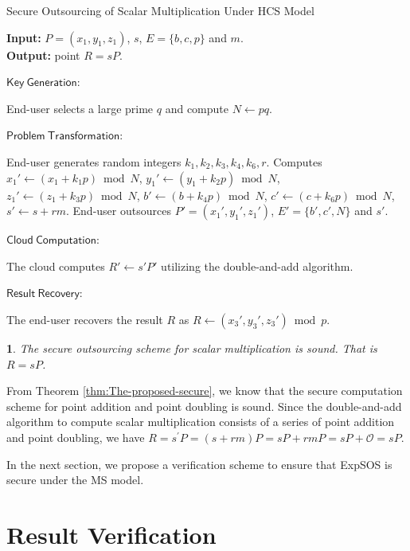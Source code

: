 \documentclass[english,draftcls,onecolumn,11pt]{IEEEtran}
\theoremstyle{definition}
\theoremstyle{plain}
\newtheorem{thm}{\protect\theoremname}
\theoremstyle{plain}
\theoremstyle{definition}
\providecommand{\theoremname}{Theorem}
\begin{document}
\begin{algorithm}[tbh]
\caption{Secure Outsourcing of Scalar Multiplication Under HCS Model\label{alg:Secure-Outsourcing}}

\textbf{Input:} $P=(x_1,y_1,z_1)$, $s$, $E=\{b,c,p\}$ and $m$.\\
\textbf{Output:} point $R=sP$.

$\mathsf{Key~Generation}$:
\begin{algorithmic}[1] 
\STATE End-user selects a large prime $q$ and compute $N\leftarrow pq$.
\end{algorithmic} 

$\mathsf{Problem~Transformation}$:
\begin{algorithmic}[1] 
\STATE End-user generates random integers $k_1,k_2,k_3,k_4,k_6,r$.
\STATE Computes $x_1'\leftarrow (x_1+k_1p)\bmod N$, $y_1'\leftarrow (y_1+k_2p)\bmod N$, $z_1'\leftarrow (z_1+k_3p)\bmod N$, $b'\leftarrow (b+k_4p)\bmod N$, $c'\leftarrow (c+k_6p)\bmod N$, $s'\leftarrow s+rm$. 
\STATE End-user outsources $P'=(x_1',y_1',z_1')$, $E'=\{ b',c',N\} $ and $s'$.
\end{algorithmic} 

$\mathsf{Cloud~Computation}$:
\begin{algorithmic}[1] 
\STATE The cloud computes $R'\leftarrow s'P'$ utilizing the double-and-add algorithm.
\end{algorithmic}

$\mathsf{Result~Recovery}$:
\begin{algorithmic}[1] 
\STATE The end-user recovers the result $R$ as $R\leftarrow (x_3', y_3',z_3' )\bmod p$.
\end{algorithmic} 
\end{algorithm}
\begin{thm}
The secure outsourcing scheme for scalar multiplication is sound.
That is $R=sP$.\end{thm}
\begin{IEEEproof}
From Theorem \ref{thm:The-proposed-secure}, we know that the secure
computation scheme for point addition and point doubling is sound.
Since the double-and-add algorithm to compute scalar multiplication
consists of a series of point addition and point doubling, we have
$R=s^{\prime}P=(s+rm)P=sP+rmP=sP+\mathcal{O}=sP$.
\end{IEEEproof}
In the next section, we propose a verification scheme to ensure that
ExpSOS is secure under the MS model. 


\section{Result Verification \label{sec:Result-Verification}}
\end{document}
